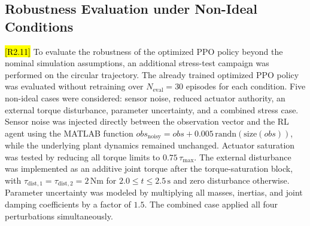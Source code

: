 \documentclass{ieeeaccess}
\newcommand{\hltwo}[1]{{\sethlcolor{rtwo}\hl{#1}}}
\newenvironment{rtwohl}
  {\def\FrameCommand{\colorbox{rtwo}}\MakeFramed{\advance\hsize-\width\FrameRestore}}
  {\endMakeFramed}
\begin{document}
\subsection{Robustness Evaluation under Non-Ideal Conditions}\label{sec:robustness_eval}
\begin{rtwohl}
\hltwo{[R2.11]} To evaluate the robustness of the optimized PPO policy beyond the nominal simulation assumptions,
an additional stress-test campaign was performed on the circular trajectory. The already trained optimized PPO policy
was evaluated without retraining over $N_{\mathrm{eval}}=30$ episodes for each condition. Five non-ideal cases were
considered: sensor noise, reduced actuator authority, an external torque disturbance, parameter uncertainty, and a
combined stress case. Sensor noise was injected directly between the observation vector and the RL agent using the
MATLAB function $obs_{\mathrm{noisy}} = obs + 0.005\,\mathrm{randn}(\mathrm{size}(obs))$, while the underlying plant
dynamics remained unchanged. Actuator saturation was tested by reducing all torque limits to $0.75\,\tau_{\max}$.
The external disturbance was implemented as an additive joint torque after the torque-saturation block, with
$\tau_{\mathrm{dist},1}=\tau_{\mathrm{dist},2}=2\,\mathrm{Nm}$ for $2.0 \leq t \leq 2.5\,\mathrm{s}$ and zero
disturbance otherwise. Parameter uncertainty was modeled by multiplying all masses, inertias, and joint damping
coefficients by a factor of $1.5$. The combined case applied all four perturbations simultaneously.
\end{rtwohl}
\end{document}
